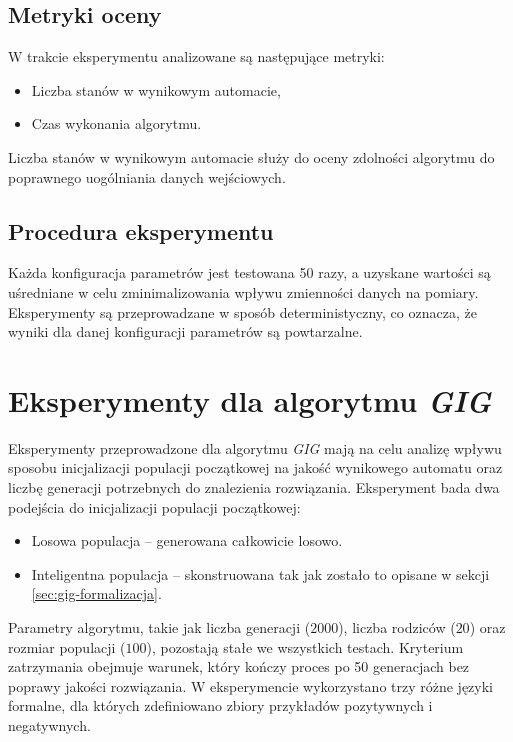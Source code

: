 \subsection{Metryki oceny}  
W trakcie eksperymentu analizowane są następujące metryki:  
\begin{itemize}  
    \item Liczba stanów w wynikowym automacie,  
    \item Czas wykonania algorytmu.  
\end{itemize}  

Liczba stanów w wynikowym automacie służy do oceny zdolności algorytmu do poprawnego uogólniania danych wejściowych.  

\subsection{Procedura eksperymentu}  
Każda konfiguracja parametrów jest testowana 50 razy, a uzyskane wartości są uśredniane w celu zminimalizowania wpływu zmienności danych na pomiary. Eksperymenty są przeprowadzane w sposób deterministyczny, co oznacza, że wyniki dla danej konfiguracji parametrów są powtarzalne.  


\section{Eksperymenty dla algorytmu \textit{GIG}} 
Eksperymenty przeprowadzone dla algorytmu \textit{GIG} mają na celu analizę wpływu sposobu inicjalizacji populacji początkowej na jakość wynikowego automatu oraz liczbę generacji potrzebnych do znalezienia rozwiązania. Eksperyment bada dwa podejścia do inicjalizacji populacji początkowej:  
\begin{itemize}  
    \item Losowa populacja -- generowana całkowicie losowo.  
    \item Inteligentna populacja -- skonstruowana tak jak zostało to opisane w sekcji \ref{sec:gig-formalizacja}.  
\end{itemize}  

Parametry algorytmu, takie jak liczba generacji (\(2000\)), liczba rodziców (\(20\)) oraz rozmiar populacji (\(100\)), pozostają stałe we wszystkich testach. Kryterium zatrzymania obejmuje warunek, który kończy proces po 50 generacjach bez poprawy jakości rozwiązania. W eksperymencie wykorzystano trzy różne języki formalne, dla których zdefiniowano zbiory przykładów pozytywnych i negatywnych. 

